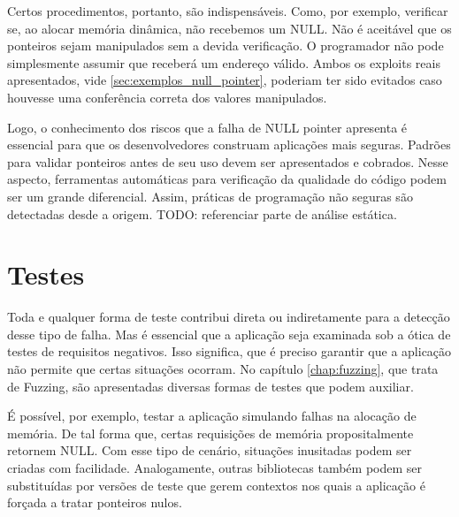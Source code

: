 			Certos procedimentos, portanto, são indispensáveis. Como, por exemplo, verificar se,
			ao alocar memória dinâmica, não recebemos um NULL. Não é aceitável que
			os ponteiros sejam manipulados sem a devida verificação. O programador não pode simplesmente
			assumir que receberá um endereço válido. Ambos os exploits reais apresentados, vide
			\ref{sec:exemplos_null_pointer}, poderiam ter sido evitados caso houvesse uma conferência correta
			dos valores manipulados.

			
			Logo, o conhecimento dos riscos que a falha de NULL pointer apresenta é essencial
			para que os desenvolvedores construam aplicações mais seguras.
			Padrões para validar ponteiros antes de seu uso devem ser apresentados e cobrados.
			Nesse aspecto, ferramentas automáticas para verificação da qualidade do código podem
			ser um grande diferencial. Assim, práticas de programação não seguras são
			detectadas desde a origem. TODO: referenciar parte de análise estática.

		\section{Testes}
			Toda e qualquer forma de teste contribui direta ou indiretamente para a detecção
			desse tipo de falha. Mas é essencial que a aplicação seja examinada sob
			a ótica de testes de requisitos negativos. Isso significa, que é preciso
			garantir que a aplicação não permite que certas situações ocorram.
			No capítulo \ref{chap:fuzzing}, que trata de Fuzzing, são apresentadas
			diversas formas de testes que podem auxiliar.

			
			É possível, por exemplo, testar a aplicação simulando falhas na alocação de memória.
			De tal forma que, certas requisições de memória propositalmente retornem NULL.
			Com esse tipo de cenário, situações inusitadas podem ser criadas com facilidade.
			Analogamente, outras bibliotecas também podem ser substituídas por versões
			de teste que gerem contextos nos quais a aplicação é forçada a tratar ponteiros nulos.			


